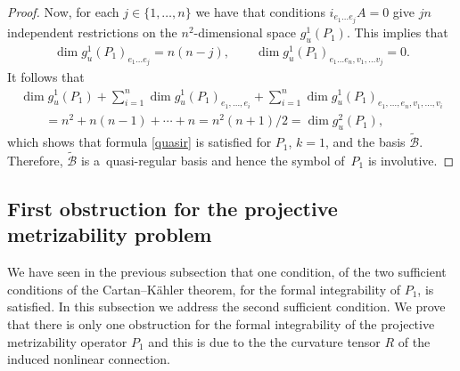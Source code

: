 \documentclass[pdftex]{sigma}
\numberwithin{equation}{section}
\begin{document}
\begin{proof}
Now, for each $j\in\{1,\dots ,n\}$ we have that conditions
$i_{e_1\dots e_j}A=0$ give $jn$ independent restrictions on the
$n^2$-dimensional space $g^1_u(P_1)$. This implies that
\begin{gather*}
 \dim g^1_u(P_1)_{e_1\dots e_j}=n(n-j), \qquad  \dim g^1_u(P_1)_{e_1\dots e_n,v_1,\dots v_j}=0.
\end{gather*}
It follows that
\begin{gather*}
  \dim g^1_u\left(P_1\right)   + \sum_{i=1}^{n} \dim
  g^1_u\left(P_1\right)_{e_1,\dots ,e_i} + \sum_{i=1}^{n} \dim
  g^1_u\left(P_1\right)_{e_1,\dots ,e_n,v_1,\dots ,v_i}
  \\
 \qquad{}  = n^2 + n(n-1) + \cdots + n= n^2(n+1)/2=\dim g^2_u\left(P_1\right),
\end{gather*}
which shows that formula
\eqref{quasir} is satisf\/ied for $P_1$, $k=1$, and the basis
$\widetilde{\mathcal B}$. Therefore, $\widetilde{\mathcal B}$ is a~quasi-regular basis and hence the symbol
of~$P_1$ is involutive.
\end{proof}

\subsection{First obstruction for the projective
metrizability problem} \label{subsec:obstr1}

We have seen in the previous subsection that one condition, of the two
suf\/f\/icient conditions of the Cartan--K\"ahler theorem, for the formal
integrability of $P_1$, is satisf\/ied. In this subsection we address the
second suf\/f\/icient condition. We prove that there is only one obstruction for the formal
integrability of the projective metrizability operator $P_1$ and this is due to the
the curvature tensor $R$ of the induced nonlinear connection.
\end{document}
